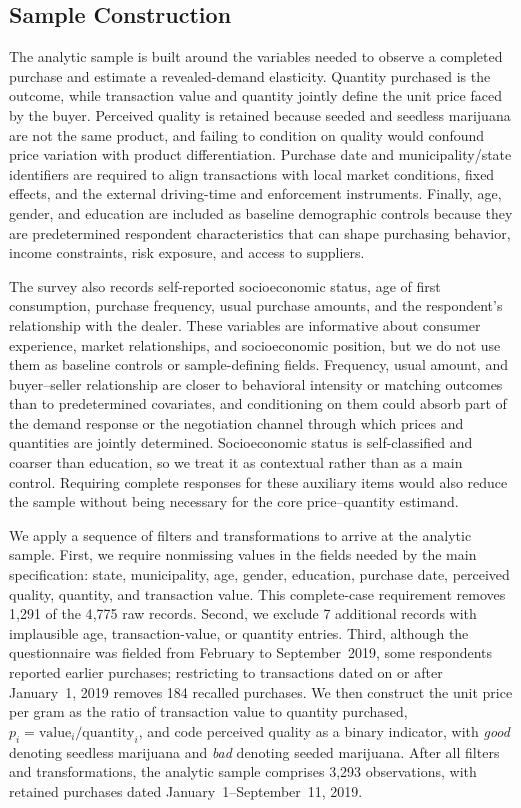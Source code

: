 \subsection{Sample Construction}

The analytic sample is built around the variables needed to observe a completed purchase and estimate a revealed-demand elasticity.  Quantity purchased is the outcome, while transaction value and quantity jointly define the unit price faced by the buyer.  Perceived quality is retained because seeded and seedless marijuana are not the same product, and failing to condition on quality would confound price variation with product differentiation.  Purchase date and municipality/state identifiers are required to align transactions with local market conditions, fixed effects, and the external driving-time and enforcement instruments.  Finally, age, gender, and education are included as baseline demographic controls because they are predetermined respondent characteristics that can shape purchasing behavior, income constraints, risk exposure, and access to suppliers.

The survey also records self-reported socioeconomic status, age of first consumption, purchase frequency, usual purchase amounts, and the respondent's relationship with the dealer.  These variables are informative about consumer experience, market relationships, and socioeconomic position, but we do not use them as baseline controls or sample-defining fields.  Frequency, usual amount, and buyer--seller relationship are closer to behavioral intensity or matching outcomes than to predetermined covariates, and conditioning on them could absorb part of the demand response or the negotiation channel through which prices and quantities are jointly determined.  Socioeconomic status is self-classified and coarser than education, so we treat it as contextual rather than as a main control.  Requiring complete responses for these auxiliary items would also reduce the sample without being necessary for the core price--quantity estimand.

We apply a sequence of filters and transformations to arrive at the analytic sample. First, we require nonmissing values in the fields needed by the main specification: state, municipality, age, gender, education, purchase date, perceived quality, quantity, and transaction value. This complete-case requirement removes 1{,}291 of the 4{,}775 raw records. Second, we exclude 7 additional records with implausible age, transaction-value, or quantity entries. Third, although the questionnaire was fielded from February to September~2019, some respondents reported earlier purchases; restricting to transactions dated on or after January~1, 2019 removes 184 recalled purchases. We then construct the unit price per gram as the ratio of transaction value to quantity purchased, $p_i = \text{value}_i / \text{quantity}_i$, and code perceived quality as a binary indicator, with \emph{good} denoting seedless marijuana and \emph{bad} denoting seeded marijuana. After all filters and transformations, the analytic sample comprises 3{,}293 observations, with retained purchases dated January~1--September~11, 2019.


